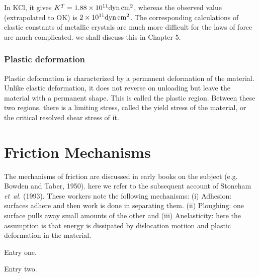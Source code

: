 In KCl, it gives $K^T = 1.88 \times 10^{11}{\rm dyn \, cm^2}$, 
whereas the observed value (extrapolated to OK) is $2 \times 
10^{11}{\rm dyn \, cm^2}$. The corresponding calculations of elastic 
constants of metallic crystals are much more difficult for the laws 
of force are much complicated. we shall discuss this in Chapter 5.

\begin{table} %
\end{table}

\subsubsection{Plastic deformation} %
Plastic deformation is characterized by a permanent deformation of 
the material. Unlike elastic deformation, it does not reverse on 
unloading but leave the material with a permanent shape. This is 
called the plastic region. Between these two regions, there is a 
limiting stress, called the yield stress of the material, or the 
critical resolved shear stress of it.                               

\section{Friction Mechanisms} %
The mechanisms of friction are discussed in early books on the 
subject (e.g. Bowden and Taber, 1950). here we refer to the subsequent 
account of Stoneham {\it et~al.}  (1993). These workers note the following 
mechanisms: (i) Adhesion: surfaces adhere and then work is done in 
separating them. (ii) Ploughing: one surface pulls away small 
amounts of the other and (iii) Anelasticity: here the assumption is 
that energy is dissipated by dislocation motiion and plastic 
deformation in the material.

\begin{alphlist}
\item %
Entry one.
\item %
Entry two.
\end{alphlist}

